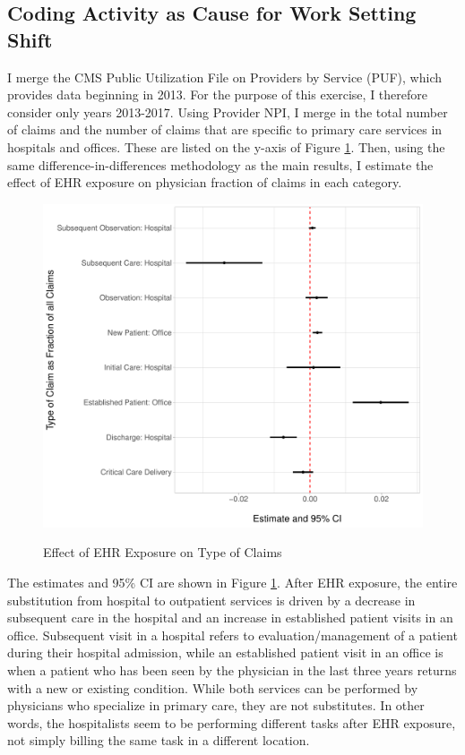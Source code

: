 \documentclass[12pt]{article}
\begin{document}
\subsection{Coding Activity as Cause for Work Setting Shift}\label{app:coding}

I merge the CMS Public Utilization File on Providers by Service (PUF), which provides data beginning in 2013. For the purpose of this exercise, I therefore consider only years 2013-2017. Using Provider NPI, I merge in the total number of claims and the number of claims that are specific to primary care services in hospitals and offices. These are listed on the y-axis of Figure \ref{fig:claims_estimates}. Then, using the same difference-in-differences methodology as the main results, I estimate the effect of EHR exposure on physician fraction of claims in each category.

\begin{figure}
    \centering
    \caption{Effect of EHR Exposure on Type of Claims}
    \includegraphics[width=\textwidth]{Objects/claim_type_results.pdf}
    \label{fig:claims_estimates}
\end{figure}



The estimates and 95\% CI are shown in Figure \ref{fig:claims_estimates}. After EHR exposure, the entire substitution from hospital to outpatient services is driven by a decrease in subsequent care in the hospital and an increase in established patient visits in an office. Subsequent visit in a hospital refers to evaluation/management of a patient during their hospital admission, while an established patient visit in an office is when a patient who has been seen by the physician in the last three years returns with a new or existing condition. While both services can be performed by physicians who specialize in primary care, they are not substitutes. In other words, the hospitalists seem to be performing different tasks after EHR exposure, not simply billing the same task in a different location. 
\end{document}
